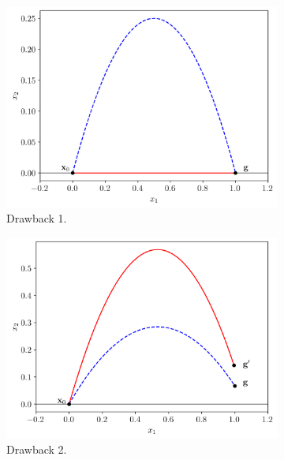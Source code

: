 \documentclass[fleqn, 11pt]{article}
\theoremstyle{definition}
\theoremstyle{plain}
\theoremstyle{remark}
\begin{document}
\begin{figure}
    \begin{subfigure}{0.3\linewidth}
        \includegraphics[width=\textwidth]{imgs/old_problem_1.png}
        \caption{Drawback 1.}
    \end{subfigure}
    \hfill
    \begin{subfigure}{0.3\linewidth}
        \includegraphics[width=\textwidth]{imgs/old_problem_2.png}
        \caption{Drawback 2.}
    \end{subfigure}
    \hfill
    \begin{subfigure}{0.3\linewidth}

\end{subfigure}
\end{figure}
\end{document}

